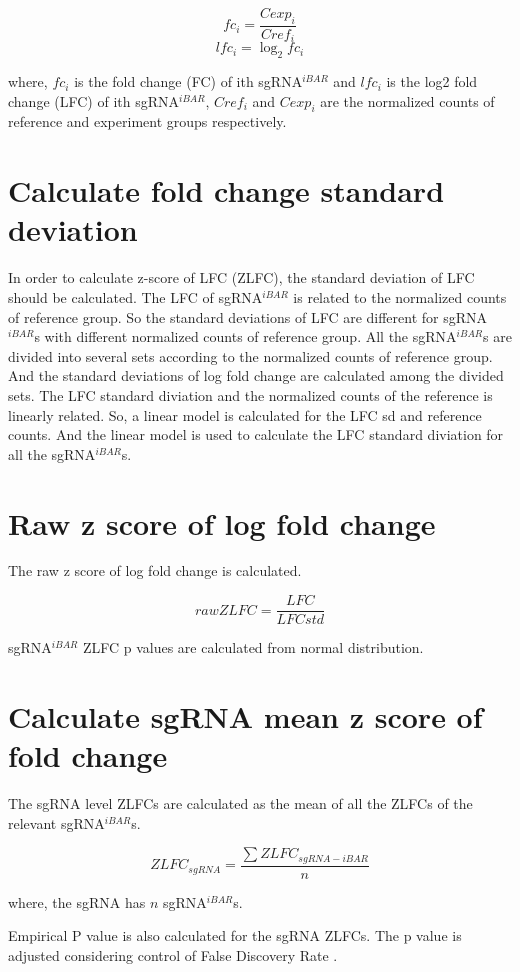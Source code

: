 \documentclass[11pt, a4paper]{article}
\begin{document}
$$fc_{i} = \frac{Cexp_{i}}{Cref_{i}}$$
$$lfc_{i} = \log_{2}fc_{i}$$

where, $fc_{i}$ is the fold change (FC) of ith sgRNA$^{iBAR}$ and
$lfc_{i}$ is the log2 fold change (LFC) of ith sgRNA$^{iBAR}$,
$Cref_{i}$ and $Cexp_{i}$ are the normalized counts of reference
and experiment groups respectively.

\section{Calculate fold change standard deviation}

In order to calculate z-score of LFC (ZLFC), the standard deviation of
LFC should be calculated. The LFC of sgRNA$^{iBAR}$ is related to the
normalized counts of reference group. So the standard deviations of
LFC are different for sgRNA$^{iBAR}$s with different normalized counts
of reference group. All the sgRNA$^{iBAR}$s are divided into several
sets according to the normalized counts of reference group. And the
standard deviations of log fold change are calculated among the
divided sets. The LFC standard diviation and the normalized counts of
the reference is linearly related. So, a linear model is calculated
for the LFC sd and reference counts. And the linear model is used to
calculate the LFC standard diviation for all the sgRNA$^{iBAR}$s.

\section{Raw z score of log fold change}

The raw z score of log fold change is calculated.

$$raw ZLFC = \frac{LFC}{LFC std}$$

sgRNA$^{iBAR}$ ZLFC p values are calculated from normal distribution.

\section{Calculate sgRNA mean z score of fold change}

The sgRNA level ZLFCs are calculated as the mean of all the ZLFCs of
the relevant sgRNA$^{iBAR}$s.

$$ZLFC_{sgRNA} = \frac{\sum{ZLFC_{sgRNA-iBAR}}}{n}$$

where, the sgRNA has $n$ sgRNA$^{iBAR}$s.

Empirical P value is also calculated for the sgRNA ZLFCs. The p value
is adjusted considering control of False Discovery Rate
\citep{benjamini_controlling_1995}.
\end{document}

